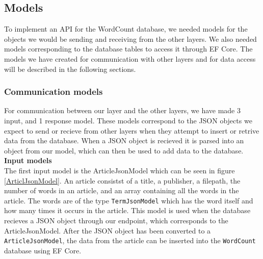 \subsection{Models}
To implement an API for the WordCount database, we needed models for the objects we would be sending and receiving from the other layers. 
We also needed models corresponding to the database tables to access it through EF Core. The models we have created for communication with other layers and for data access will be described in the following sections.

\subsubsection*{Communication models}
For communication between our layer and the other layers, we have made 3 input, and 1 response model. 
These models correspond to the JSON objects we expect to send or recieve from other layers when they attempt to insert or retrive data from the database. 
When a JSON object is recieved it is parsed into an object from our model, which can then be used to add data to the database.
\\

\textbf{Input models}\\
The first input model is the ArticleJsonModel which can be seen in figure \ref{ArticlJsonModel}. An article consistst of a title, a publisher, a filepath, the number of words in an article, and an array containing all the words in the article. 
The words are of the type \texttt{TermJsonModel} which has the word itself and how many times it occurs in the article.
This model is used when the database recieves a JSON object through our endpoint, which corresponds to the ArticleJsonModel. 
After the JSON object has been converted to a \texttt{ArticleJsonModel}, the data from the article can be inserted into the \texttt{WordCount} database using EF Core.

